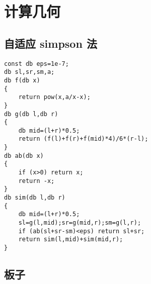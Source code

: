 \documentclass[12pt]{ctexart}
\begin{document}
\newpage

\section{计算几何}

\subsection{自适应 simpson 法}

\begin{lstlisting}
const db eps=1e-7;
db sl,sr,sm,a;
db f(db x)
{
	return pow(x,a/x-x);
}
db g(db l,db r)
{
	db mid=(l+r)*0.5;
	return (f(l)+f(r)+f(mid)*4)/6*(r-l);
}
db ab(db x)
{
	if (x>0) return x;
	return -x;
}
db sim(db l,db r)
{
	db mid=(l+r)*0.5;
	sl=g(l,mid);sr=g(mid,r);sm=g(l,r);
	if (ab(sl+sr-sm)<eps) return sl+sr;
	return sim(l,mid)+sim(mid,r);
}
\end{lstlisting}

\subsection{板子}
\end{document}
